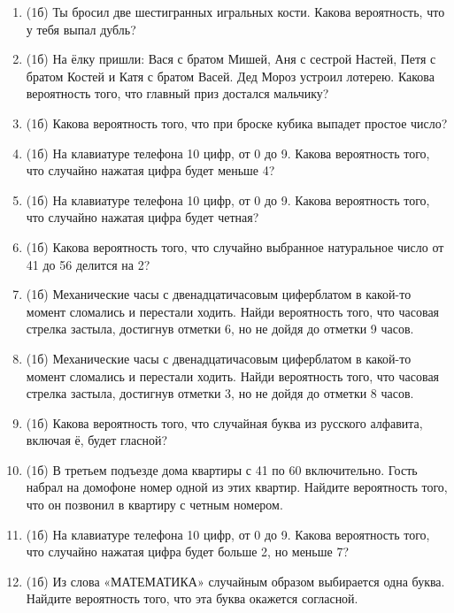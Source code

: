 \documentclass[a4paper, 12pt]{article}
\begin{document}
\begin{enumerate}
\item (1б) Ты бросил две шестигранных игральных кости. Какова вероятность, что у тебя выпал дубль?

\item (1б) На ёлку пришли: Вася с братом Мишей, Аня с сестрой Настей, Петя с братом Костей и Катя с братом Васей. Дед Мороз устроил лотерею. 
Какова вероятность того, что главный приз достался мальчику?

\item (1б) Какова вероятность того, что при броске кубика выпадет простое число?

\item (1б) На клавиатуре телефона 10 цифр, от 0 до 9. Какова вероятность того, что случайно нажатая цифра будет меньше 4?

\item (1б) На клавиатуре телефона 10 цифр, от 0 до 9. Какова вероятность того, что случайно нажатая цифра будет четная?

\item (1б) Какова вероятность того, что случайно выбранное натуральное число от 41 до 56 делится на 2?

\item (1б) Механические часы с двенадцатичасовым циферблатом в какой-то момент сломались и перестали ходить. Найди вероятность того, 
что часовая стрелка застыла, достигнув отметки 6, но не дойдя до отметки 9 часов.

\item (1б) Механические часы с двенадцатичасовым циферблатом в какой-то момент сломались и перестали ходить. Найди вероятность того, 
что часовая стрелка застыла, достигнув отметки 3, но не дойдя до отметки 8 часов.

\item (1б) Какова вероятность того, что случайная буква из русского алфавита, включая ё, будет гласной?

\item (1б) В третьем подъезде дома квартиры с 41 по 60 включительно. Гость набрал на домофоне номер одной из этих квартир. 
Найдите вероятность того, что он позвонил в квартиру с четным номером. 

\item (1б) На клавиатуре телефона 10 цифр, от 0 до 9. Какова вероятность того, что случайно нажатая цифра будет больше 2, но меньше 7? 

\item (1б) Из слова «МАТЕМАТИКА» случайным образом выбирается одна буква. Найдите вероятность того, что эта буква окажется согласной.


\end{enumerate}
\end{document}
